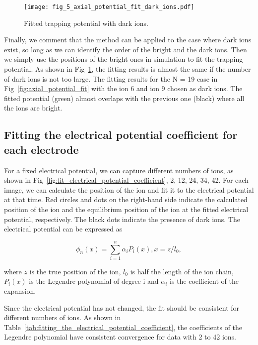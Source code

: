 \begin{figure}
    \centering
    \texttt{[image: fig\_5\_axial\_potential\_fit\_dark\_ions.pdf]}
    \caption{Fitted trapping potential with dark ions.}
    \label{fig:axial_potential_fit_dark_ions}
\end{figure}

Finally, we comment that the method can be applied to the case where dark ions exist, so long as we can identify the order of the bright and the dark ions. Then we simply use the positions of the bright ones in simulation to fit the trapping potential. As shown in Fig~\ref{fig:axial_potential_fit_dark_ions}, the fitting results is almost the same if the number of dark ions is not too large. The fitting results for the N = 19 case in Fig~\ref{fig:axial_potential_fit} with the ion 6 and ion 9 chosen as dark ions. The fitted potential (green) almost overlaps with the previous one (black) where
all the ions are bright.

\subsection{Fitting the electrical potential coefficient for each electrode}

For a fixed electrical potential, we can capture different numbers of ions, as shown in Fig~\ref{fig:fit_electrical_potential_coefficient}, 2, 12, 24, 34, 42. For each image, we can calculate the position of the ion and fit it to the electrical potential at that time. Red circles and dots on the right-hand side indicate the calculated position of the ion and the equilibrium position of the ion at the fitted electrical potential, respectively. The black dots indicate the presence of dark ions. The electrical potential can be expressed as

\begin{equation}
    \phi_n(x)=\sum_{i=1}^n \alpha_i P_i(x), x=z / l_0,
\end{equation}

where $z$ is the true position of the ion, $l_0$ is half the length of the ion chain, $P_i(x)$ is the Legendre polynomial of degree i and $\alpha_i$ is the coefficient of the expansion.

Since the electrical potential has not changed, the fit should be consistent for different numbers of ions. As shown in Table~\ref{tab:fitting_the_electrical_potential_coefficient}, the coefficients of the Legendre polynomial have consistent convergence for data with 2 to 42 ions.

